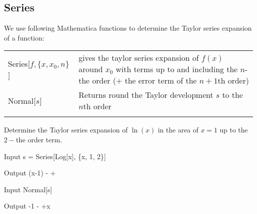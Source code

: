 %


\subsection{Series}
We use following Mathematica functions to determine the Taylor series expansion of a function:	

\begin{tabular}{>{\hfill}p{5cm}p{12cm}}
	Series[$f,\{x,x_0,n\}$	]						&			gives the taylor series expansion of $f(x)$ around $x_0$ with terms up to and including the $n$-the order (+ the error term of the $n+1$th order)\\
	Normal[$s$]						&			Returns round the Taylor development $s$ to the $n$th order \\
	\multicolumn{2}{l}{} 
\end{tabular}

\begin{example}
	Determine the Taylor series expansion of $\ln(x)$ in the area of  $x=1$ up to the $2-$the order term. 

\begin{mdframed}[default,backgroundcolor=gray!40,roundcorner=8pt]

	\begin{mmaCell}[functionlocal={x}]{Input}
		s = Series[Log[x], \{x, 1, 2\}]
	\end{mmaCell}
	\begin{mmaCell}{Output}
		(x-1) -  +
	\end{mmaCell}

	\begin{mmaCell}[functionlocal={x}]{Input}
		Normal[s]
	\end{mmaCell}
	\begin{mmaCell}{Output}
		-1 - +x
	\end{mmaCell}
	
\end{mdframed}
\end{example}

